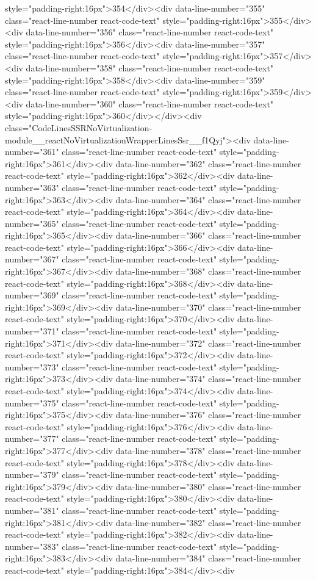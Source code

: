 {{{{{{{style="padding-right:16px">354</div><div data-line-number="355" class="react-line-number react-code-text" style="padding-right:16px">355</div><div data-line-number="356" class="react-line-number react-code-text" style="padding-right:16px">356</div><div data-line-number="357" class="react-line-number react-code-text" style="padding-right:16px">357</div><div data-line-number="358" class="react-line-number react-code-text" style="padding-right:16px">358</div><div data-line-number="359" class="react-line-number react-code-text" style="padding-right:16px">359</div><div data-line-number="360" class="react-line-number react-code-text" style="padding-right:16px">360</div></div><div class="CodeLinesSSRNoVirtualization-module__reactNoVirtualizationWrapperLinesSsr__f1Qyj"><div data-line-number="361" class="react-line-number react-code-text" style="padding-right:16px">361</div><div data-line-number="362" class="react-line-number react-code-text" style="padding-right:16px">362</div><div data-line-number="363" class="react-line-number react-code-text" style="padding-right:16px">363</div><div data-line-number="364" class="react-line-number react-code-text" style="padding-right:16px">364</div><div data-line-number="365" class="react-line-number react-code-text" style="padding-right:16px">365</div><div data-line-number="366" class="react-line-number react-code-text" style="padding-right:16px">366</div><div data-line-number="367" class="react-line-number react-code-text" style="padding-right:16px">367</div><div data-line-number="368" class="react-line-number react-code-text" style="padding-right:16px">368</div><div data-line-number="369" class="react-line-number react-code-text" style="padding-right:16px">369</div><div data-line-number="370" class="react-line-number react-code-text" style="padding-right:16px">370</div><div data-line-number="371" class="react-line-number react-code-text" style="padding-right:16px">371</div><div data-line-number="372" class="react-line-number react-code-text" style="padding-right:16px">372</div><div data-line-number="373" class="react-line-number react-code-text" style="padding-right:16px">373</div><div data-line-number="374" class="react-line-number react-code-text" style="padding-right:16px">374</div><div data-line-number="375" class="react-line-number react-code-text" style="padding-right:16px">375</div><div data-line-number="376" class="react-line-number react-code-text" style="padding-right:16px">376</div><div data-line-number="377" class="react-line-number react-code-text" style="padding-right:16px">377</div><div data-line-number="378" class="react-line-number react-code-text" style="padding-right:16px">378</div><div data-line-number="379" class="react-line-number react-code-text" style="padding-right:16px">379</div><div data-line-number="380" class="react-line-number react-code-text" style="padding-right:16px">380</div><div data-line-number="381" class="react-line-number react-code-text" style="padding-right:16px">381</div><div data-line-number="382" class="react-line-number react-code-text" style="padding-right:16px">382</div><div data-line-number="383" class="react-line-number react-code-text" style="padding-right:16px">383</div><div data-line-number="384" class="react-line-number react-code-text" style="padding-right:16px">384</div><div }}}}}}}
